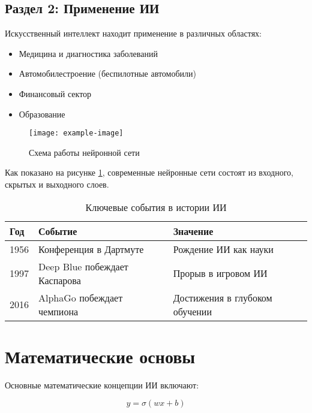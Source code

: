 \documentclass[14pt]{extreport}
\begin{document}
\section{Раздел 2: Применение ИИ}
Искусственный интеллект находит применение в различных областях:

\begin{itemize}
\item Медицина и диагностика заболеваний
\item Автомобилестроение (беспилотные автомобили)
\item Финансовый сектор
\item Образование
\end{itemize}

\begin{figure}[h]
\centering
\texttt{[image: example-image]} %
\caption{Схема работы нейронной сети}
\label{fig:neural_network}
\end{figure}

Как показано на рисунке \ref{fig:neural_network}, современные нейронные сети состоят из входного, скрытых и выходного слоев.

\begin{table}[h]
\centering
\begin{tabular}{|p{2cm}|p{4cm}|p{5cm}|} %
\hline
\textbf{Год} & \textbf{Событие} & \textbf{Значение} \\
\hline
1956 & Конференция в Дартмуте & Рождение ИИ как науки \\
\hline
1997 & Deep Blue побеждает Каспарова & Прорыв в игровом ИИ \\
\hline
2016 & AlphaGo побеждает чемпиона & Достижения в глубоком обучении \\
\hline
\end{tabular}
\caption{Ключевые события в истории ИИ}
\label{tab:ai_history}
\end{table}

\chapter{Математические основы}
Основные математические концепции ИИ включают:

\begin{equation}
y = \sigma(wx + b)
\end{equation}
\end{document}
